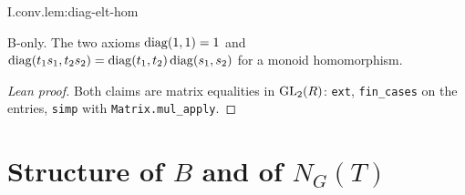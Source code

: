 \begin{lemma}
\bonly
{}
\end{lemma}
\begin{tfformal}{I.conv.lem:diag-elt-hom}
\begin{tffidelity}
B-only. The two axioms $\operatorname{diag}(1,1)=1$ and $\operatorname{diag}(t_1s_1,t_2s_2)=\operatorname{diag}(t_1,t_2)\operatorname{diag}(s_1,s_2)$ for a monoid homomorphism.
\end{tffidelity}
\end{tfformal}
\begin{proof}[Lean proof]
Both claims are matrix equalities in $\mathrm{GL}_2(R)$: \texttt{ext}, \texttt{fin\_cases} on the entries, \texttt{simp} with \texttt{Matrix.mul\_apply}.
\end{proof}

\section{\texorpdfstring{Structure of $B$ and of $N_G(T)$}{Structure of B and of NG(T)}}

